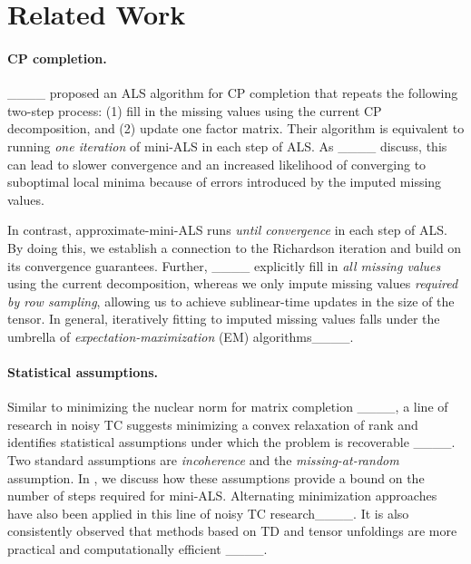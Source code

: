 \section{Related Work}
\label{sec:related-work}

\paragraph{CP completion.}
____ proposed an ALS algorithm for CP completion that repeats the following two-step process:
(1) fill in the missing values using the current CP decomposition, and 
(2) update one factor matrix.
Their algorithm is equivalent to running \emph{one iteration} of mini-ALS in each step of ALS.
As ____ discuss, this can lead to slower convergence and an increased likelihood of converging to suboptimal local minima because of errors introduced by the imputed missing values.

In contrast, approximate-mini-ALS runs \emph{until convergence} in each step of ALS.
By doing this, we establish a connection to the Richardson iteration
and build on its convergence guarantees.
Further, ____ explicitly fill in \emph{all missing values} using the current decomposition, whereas we only impute missing values \emph{required by row sampling},
allowing us to achieve sublinear-time updates in the size of the tensor.
In general, iteratively fitting to imputed missing values falls under the umbrella of \emph{expectation-maximization} (EM) algorithms____.

\paragraph{Statistical assumptions.}
Similar to minimizing the nuclear norm for matrix completion ____, a line of research in noisy TC suggests minimizing a convex relaxation of rank and identifies statistical assumptions under which the problem is recoverable ____.
Two standard assumptions are \emph{incoherence} and the \emph{missing-at-random} assumption. %
In , we discuss how these assumptions provide a bound on the number of steps required for mini-ALS.
Alternating minimization approaches have also been applied
in this line of noisy TC research____.
It is also consistently observed that methods based on TD and tensor unfoldings are more practical and computationally efficient ____.